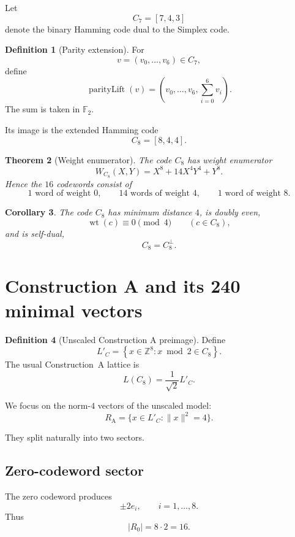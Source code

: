 \documentclass[11pt,a4paper]{article}
\newtheorem{theorem}{Theorem}[section]
\newtheorem{corollary}[theorem]{Corollary}
\theoremstyle{definition}
\newtheorem{definition}[theorem]{Definition}
\theoremstyle{remark}
\newcommand{\F}{\mathbb F}
\newcommand{\Z}{\mathbb Z}
\newcommand{\RA}{R_{\mathrm A}}
\newcommand{\wt}{\operatorname{wt}}
\begin{document}
	Let
	\[
	C_7=[7,4,3]
	\]
	denote the binary Hamming code dual to the Simplex code.
	
	\begin{definition}[Parity extension]
		For
		\[
		v=(v_0,\ldots,v_6)\in C_7,
		\]
		define
		\[
		\operatorname{parityLift}(v)
		=
		\left(
		v_0,\ldots,v_6,
		\sum_{i=0}^{6}v_i
		\right).
		\]
		The sum is taken in $\F_2$.
	\end{definition}
	
	Its image is the extended Hamming code
	\[
	C_8=[8,4,4].
	\]
	
	\begin{theorem}[Weight enumerator]
		The code $C_8$ has weight enumerator
		\[
		W_{C_8}(X,Y)
		=
		X^8+14X^4Y^4+Y^8.
		\]
		Hence the $16$ codewords consist of
		\[
		1\text{ word of weight }0,\qquad
		14\text{ words of weight }4,\qquad
		1\text{ word of weight }8.
		\]
	\end{theorem}
	
	\begin{corollary}
		The code $C_8$ has minimum distance $4$, is doubly even,
		\[
		\wt(c)\equiv0\pmod4
		\qquad(c\in C_8),
		\]
		and is self-dual,
		\[
		C_8=C_8^\perp.
		\]
	\end{corollary}
	
	\section{Construction A and its 240 minimal vectors}
	
	\begin{definition}[Unscaled Construction A preimage]
		Define
		\[
		L'_C
		=
		\left\{
		x\in\Z^8:
		x\bmod2\in C_8
		\right\}.
		\]
		The usual Construction~A lattice is
		\[
		L(C_8)
		=
		\frac1{\sqrt2}L'_C.
		\]
	\end{definition}
	
	We focus on the norm-$4$ vectors of the unscaled model:
	\[
	\RA
	=
	\{x\in L'_C:\|x\|^2=4\}.
	\]
	
	They split naturally into two sectors.
	
	\subsection{Zero-codeword sector}
	
	The zero codeword produces
	\[
	\pm2e_i,
	\qquad i=1,\ldots,8.
	\]
	Thus
	\[
	|R_0|=8\cdot2=16.
	\]
	
\end{document}

